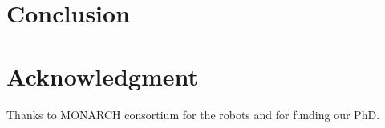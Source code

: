 \section{Conclusion}
\label{sec:conclusion}

\section{Acknowledgment}
Thanks to MONARCH consortium for the robots and for funding our PhD. 

